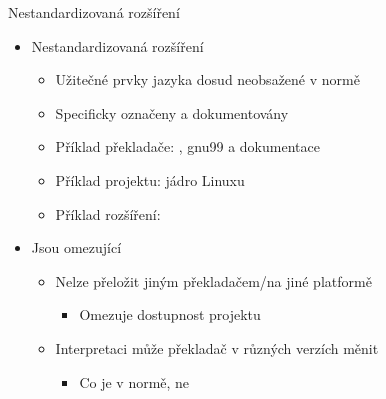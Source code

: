 \begin{frame}{Nestandardizovaná rozšíření}

  \begin{itemize}
    \item Nestandardizovaná rozšíření
    \begin{itemize}
      \item Užitečné prvky jazyka dosud neobsažené v normě
      \item Specificky označeny a dokumentovány

      \pause

      \item Příklad překladače: , gnu99 a dokumentace 
      \item Příklad projektu: jádro Linuxu
      \item Příklad rozšíření: 
    \end{itemize}

    \pause

    \item Jsou omezující
    \begin{itemize}
      \item Nelze přeložit jiným překladačem/na jiné platformě
      \begin{itemize}
	\item Omezuje dostupnost projektu
      \end{itemize}

      \pause

      \item Interpretaci může překladač v různých verzích měnit
      \begin{itemize}
	\item Co je v normě, ne
      \end{itemize}
    \end{itemize}
  \end{itemize}

\end{frame}

